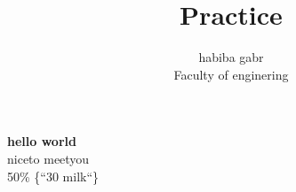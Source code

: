 \documentclass{article}
\title{Practice}
\author{habiba gabr\\
Faculty of enginering}
\date{ }
\begin{document}
	\maketitle
\textbf{hello world}	\\
nice\quad to meet\qquad you\\
50\% \{``30 milk``\}
\end{document}
